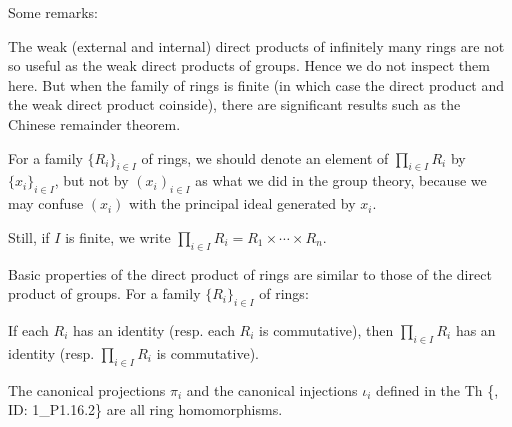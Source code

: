 \documentclass{article}
\begin{document}
\begin{Rmk}{}
    Some remarks:
    \begin{compactenum}
        \item The weak (external and internal) direct products of infinitely many rings are not so useful as the weak direct products of groups. Hence we do not inspect them here. But when the family of rings is finite (in which case the direct product and the weak direct product coinside), there are significant results such as the Chinese remainder theorem.
        \item For a family $\{R_i\}_{i\in I}$ of rings, we should denote an element of $\prod_{i\in I} R_i$ by $\{x_i\}_{i\in I}$, but not by $(x_i)_{i\in I}$ as what we did in the group theory, because we may confuse $(x_i)$ with the principal ideal generated by $x_i$.
        \item \textcolor{Df}{Still, if $I$ is finite, we write $\prod_{i\in I} R_i = R_1\times\cdots\times R_n$.}
    \end{compactenum}
    Basic properties of the direct product of rings are similar to those of the direct product of groups. For a family $\{R_i\}_{i\in I}$ of rings:
    \begin{compactenum}
        \item \textcolor{Th}{If each $R_i$ has an identity (resp. each $R_i$ is commutative), then $\prod_{i\in I} R_i$ has an identity (resp. $\prod_{i\in I} R_i$ is commutative).} 
        \item \textcolor{Th}{The} \textcolor{Df}{canonical projections $\pi_i$ and the canonical injections $\iota_i$ defined in the Th \{, ID: 1\_P1.16.2\}} \textcolor{Th}{are all ring homomorphisms.}
    \end{compactenum}
\end{Rmk}
\end{document}
